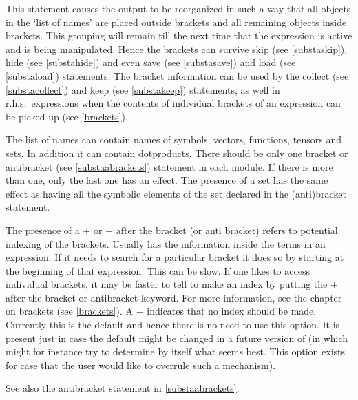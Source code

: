 \noindent This statement causes the output to be reorganized in such a way 
that all objects in the `list of names' are placed outside 
brackets and all remaining objects inside 
brackets. This grouping will remain till the next time that 
the expression is active and is being manipulated. Hence the brackets can 
survive skip (see \ref{substaskip}), hide (see \ref{substahide}) and even 
save (see \ref{substasave}) and load (see \ref{substaload}) statements. The 
bracket information can be used by the collect (see \ref{substacollect}) 
and keep (see \ref{substakeep}) statements, as well in r.h.s.\ expressions 
when the contents of individual brackets of an expression can be picked up 
(see \ref{brackets}). \vspace{4mm}

\noindent The list of names can contain names of symbols, vectors, 
functions, tensors and sets. In addition it can contain dotproducts. There 
should be only one bracket or antibracket (see \ref{substaabrackets}) 
statement in each module. If there is more than one, only the last one has 
an effect. The presence of a set has the same effect as having all the 
symbolic elements of the set declared in the (anti)bracket 
statement.\vspace{4mm}

\noindent The presence of a $+$ or $-$ after the bracket (or anti bracket) 
refers to potential indexing of the brackets. 
Usually {\FORM} has the information inside the terms in an expression. If 
it needs to search for a particular bracket it does so by starting at the 
beginning of that expression. This can be slow. If one likes to access 
individual brackets, it may be faster to tell {\FORM} to make an index by 
putting the $+$ after the bracket or antibracket keyword. For more 
information, see the chapter on brackets (see \ref{brackets}). A $-$ 
indicates that no index should be made. Currently this is the default and 
hence there is no need to use this option. It is present just in case the 
default might be changed in a future version of {\FORM} (in which {\FORM} 
might for instance try to determine by itself what seems best. This option 
exists for case that the user would like to overrule such a mechanism). 
\vspace{4mm}

\noindent See also the antibracket statement in \ref{substaabrackets}.
\vspace{10mm}

%
